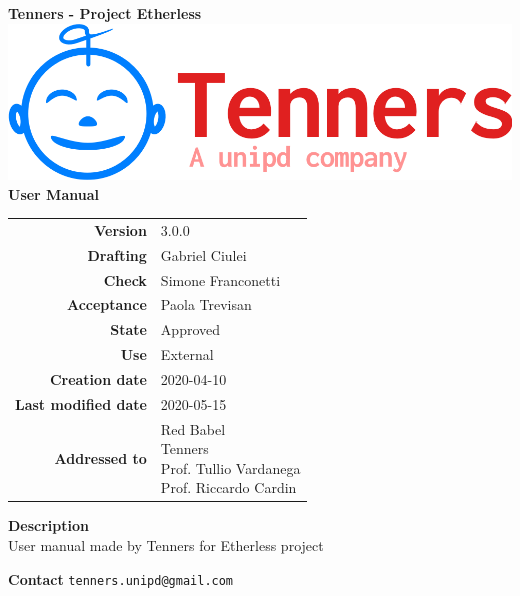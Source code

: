 \begin{titlepage}
	\begin{center}
		\large \textbf{Tenners - Project Etherless}
		\vfill
		\includegraphics[scale = 0.3]{./res/img/logo.png}\\
		\vfill
		\Huge \textbf{User Manual}

        \vfill
        \large

        \begin{tabular}{r|l}
                        \textbf{Version} & 3.0.0 \\
                        \textbf{Drafting} &
                        Gabriel Ciulei\\
                        \textbf{Check} &
                        Simone Franconetti\\
                        \textbf{Acceptance} &
                        Paola Trevisan\\
                        \textbf{State} & Approved \\
                        \textbf{Use} & External\\
                        \textbf{Creation date} &  2020-04-10\\
                        \textbf{Last modified date} &  2020-05-15\\
                        \textbf{Addressed to} & \parbox[t]{5cm}{Red Babel \\Tenners \\Prof. Tullio Vardanega \\Prof. Riccardo Cardin
                        							}
                \end{tabular}
                \vfill
                \normalsize
                \vfill
                                \textbf{Description}
                \\User manual made by Tenners for Etherless project
                \vfill
                \normalsize
                \vfill
                
                \textbf{Contact}
                \texttt{tenners.unipd@gmail.com}

	\end{center}
\end{titlepage}
